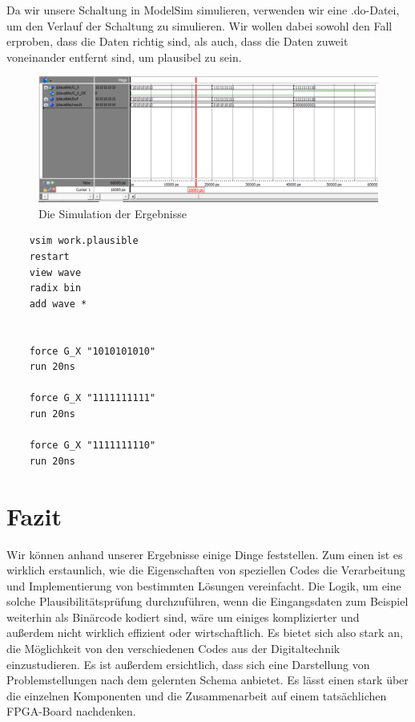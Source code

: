 \documentclass{report}
\newenvironment{longlisting}{\captionsetup{type=listing}}{}
\begin{document}
Da wir unsere Schaltung in ModelSim simulieren, verwenden wir eine .do-Datei, um den Verlauf der Schaltung zu simulieren. Wir wollen dabei sowohl den Fall erproben, dass die Daten richtig sind, als auch, dass die Daten zuweit voneinander entfernt sind, um plausibel zu sein.

\begin{figure}[h]
  \centering
  \includegraphics[width=\textwidth]{../assets/images/DIHA/simuA.png}
  \caption{Die Simulation der Ergebnisse}
  \label{fig:simuA}
\end{figure}



\begin{longlisting}
  \centering
  \begin{verbatim}
    vsim work.plausible
    restart
    view wave
    radix bin
    add wave *


    force G_X "1010101010"
    run 20ns

    force G_X "1111111111"
    run 20ns

    force G_X "1111111110"
    run 20ns
  \end{verbatim}
  \caption{.do-File (Testbench) zur Simulation der Ergebnisse in \ref{fig:simuA}}
  \label{code:doA}
\end{longlisting}


\section{Fazit}
\label{sec:fazit}

Wir können anhand unserer Ergebnisse einige Dinge feststellen. Zum einen ist es wirklich erstaunlich, wie die Eigenschaften von speziellen Codes die Verarbeitung und Implementierung von bestimmten Lösungen vereinfacht. Die Logik, um eine solche Plausibilitätsprüfung durchzuführen, wenn die Eingangsdaten zum Beispiel weiterhin als Binärcode kodiert sind, wäre um einiges komplizierter und außerdem nicht wirklich effizient oder wirtschaftlich. Es bietet sich also stark an, die Möglichkeit von den verschiedenen Codes aus der Digitaltechnik einzustudieren. Es ist außerdem ersichtlich, dass sich eine Darstellung von Problemstellungen nach dem gelernten Schema anbietet. Es lässt einen stark über die einzelnen Komponenten und die Zusammenarbeit auf einem tatsächlichen FPGA-Board nachdenken.
\end{document}
